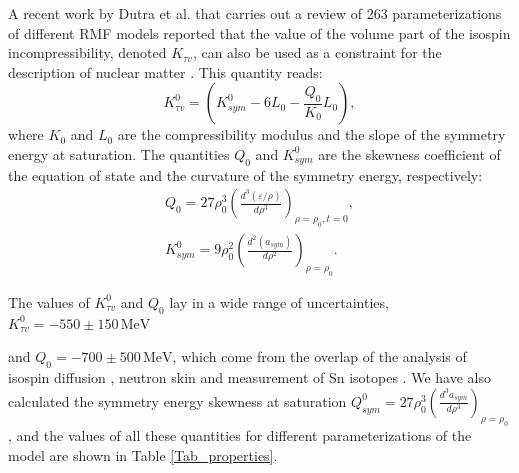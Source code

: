 \documentclass[twocolumn,showpacs,aps]{revtex4}
\begin{document}
A recent work by Dutra et al. that carries out a review of 263 parameterizations of different RMF models reported that the value of the volume
part of the isospin incompressibility, denoted $K_{\tau v}$, can also be used as a constraint for the description of nuclear matter \cite{Dutra:2014qga}.
This quantity reads:
\begin{equation}
\label{K_tauv}
K^0_{\tau v}=  \left(K^0_{sym} - 6 L_0 - \frac{Q_0}{K_0}L_0   \right),
\end{equation}
where $K_0$ and $L_0$ are the compressibility modulus and the slope of the symmetry energy at saturation.
The quantities $Q_0$ and $K^0_{sym}$ are the skewness coefficient of the equation of state and the curvature of the symmetry
energy, respectively: 
\begin{equation}\begin{split}
\label{derivatives}
Q_0=  27\rho_0^3 \left( \frac{d^3(\varepsilon/\rho)}{d\rho^3}  \right)_{\rho=\rho_0, t=0}, \\
K^0_{sym}=  9\rho_0^2 \left( \frac{d^2(a_{sym})}{d\rho^2}  \right)_{\rho=\rho_0}.
\end{split}\end{equation}

The values of $K^0_{\tau v}$ and $Q_0$ lay in a wide range of uncertainties, $K^0_{\tau v}=-550 \pm150 \, \mathrm{MeV}$
 
and $Q_0=-700 \pm 500\, \mathrm{MeV}$, which come from the overlap of the analysis of isospin diffusion \cite{Chen:2004si}, 
neutron skin \cite{Centelles:2008vu} and measurement of Sn isotopes \cite{Li:2007bp}.
We have also calculated the symmetry energy skewness at saturation
$Q^0_{sym}=  27\rho_0^3 \left( \frac{d^3 a_{sym}}{d\rho^3}  \right)_{\rho=\rho_0}$,
and the values of all these quantities for different parameterizations of the model are shown in Table \ref{Tab_properties}.
\end{document}
